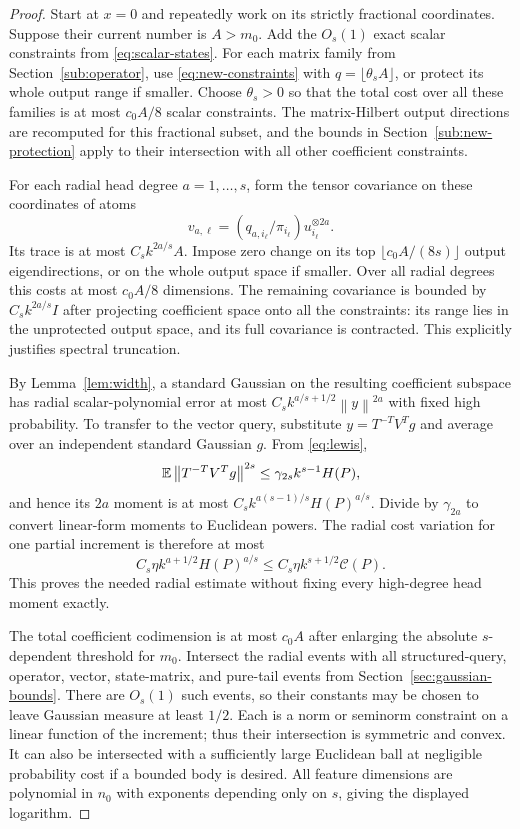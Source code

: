 \documentclass[11pt]{article}
\theoremstyle{remark}\newtheorem{remark}[theorem]{Remark}
\newcommand{\norm}[1]{\left\|#1\right\|}\newcommand{\ip}[2]{\left\langle #1,#2\right\rangle}
\newcommand{\cost}{\mathcal C}\newcommand{\OPT}{\mathsf{OPT}}
\begin{document}
\begin{proof}
Start at $x=0$ and repeatedly work on its strictly fractional coordinates. Suppose their current number is $A>m_0$. Add the $O_s(1)$ exact scalar constraints from \eqref{eq:scalar-states}. For each matrix family from Section~\ref{sub:operator}, use \eqref{eq:new-constraints} with $q=\lfloor\theta_s A\rfloor$, or protect its whole output range if smaller. Choose $\theta_s>0$ so that the total cost over all these families is at most $c_0A/8$ scalar constraints. The matrix-Hilbert output directions are recomputed for this fractional subset, and the bounds in Section~\ref{sub:new-protection} apply to their intersection with all other coefficient constraints.

For each radial head degree $a=1,\ldots,s$, form the tensor covariance on these coordinates of atoms
\[
 v_{a,\ell}=(q_{a,i_\ell}/\pi_{i_\ell})u_{i_\ell}^{\otimes2a}.
\]
Its trace is at most $C_s k^{2a/s}A$. Impose zero change on its top $\lfloor c_0 A/(8s)\rfloor$ output eigendirections, or on the whole output space if smaller. Over all radial degrees this costs at most $c_0A/8$ dimensions. The remaining covariance is bounded by $C_s k^{2a/s}I$ after projecting coefficient space onto all the constraints: its range lies in the unprotected output space, and its full covariance is contracted. This explicitly justifies spectral truncation.

By Lemma~\ref{lem:width}, a standard Gaussian on the resulting coefficient subspace has radial scalar-polynomial error at most $C_s k^{a/s+1/2}\norm y^{2a}$ with fixed high probability. To transfer to the vector query, substitute $y=T^{-T}V^Tg$ and average over an independent standard Gaussian $g$. From \eqref{eq:lewis},
\[
 \E\norm{T^{-T}V^Tg}^{2s}\le\gamma_{2s}k^{s-1}H(P),
\]
and hence its $2a$ moment is at most $C_s k^{a(s-1)/s}H(P)^{a/s}$. Divide by $\gamma_{2a}$ to convert linear-form moments to Euclidean powers. The radial cost variation for one partial increment is therefore at most
\[
 C_s\eta k^{a+1/2}H(P)^{a/s}\le C_s\eta k^{s+1/2}\cost(P).
\]
This proves the needed radial estimate without fixing every high-degree head moment exactly.

The total coefficient codimension is at most $c_0A$ after enlarging the absolute $s$-dependent threshold for $m_0$. Intersect the radial events with all structured-query, operator, vector, state-matrix, and pure-tail events from Section~\ref{sec:gaussian-bounds}. There are $O_s(1)$ such events, so their constants may be chosen to leave Gaussian measure at least $1/2$. Each is a norm or seminorm constraint on a linear function of the increment; thus their intersection is symmetric and convex. It can also be intersected with a sufficiently large Euclidean ball at negligible probability cost if a bounded body is desired. All feature dimensions are polynomial in $n_0$ with exponents depending only on $s$, giving the displayed logarithm.


\end{proof}
\end{document}
